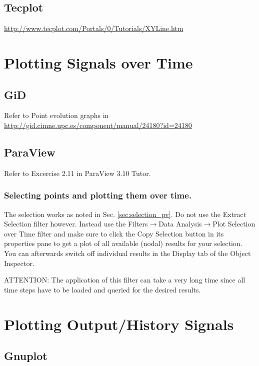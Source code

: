 \subsection{Tecplot}

\url{http://www.tecplot.com/Portals/0/Tutorials/XYLine.htm}

\section{Plotting Signals over Time}

\subsection{GiD}
Refer to Point evolution graphs in
\url{http://gid.cimne.upc.es/component/manual/24180?id=24180}

\subsection{ParaView}

Refer to Excercise 2.11 in ParaView 3.10 Tutor.

\subsubsection{Selecting points and plotting them over time.}

The selection works  as noted in Sec. \ref{sec:selection_pv}.  Do  not use the
Extract Selection  filter however.   Instead use  the Filters$\rightarrow$Data
Analysis$\rightarrow$Plot Selection  over Time filter  and make sure  to click
the  Copy Selection  button  in its  properties  pane  to get  a  plot of  all
available (nodal) results  for your selection.  You can  afterwards switch off
individual results in the Display tab of the Object Inspector.

ATTENTION: The application of this filter  can take a very long time since all
time steps have to be loaded and queried for the desired results.

\section{Plotting Output/History Signals}

\subsection{Gnuplot}

